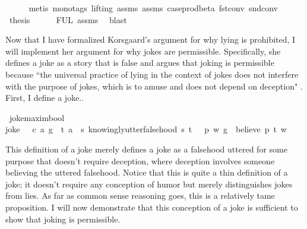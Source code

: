 \begin{isabellebody}
\ \ \ \ \isamarkupfalse%
\ {\isacharparenleft}metis\ {\isacharparenleft}mono{\isacharunderscore}tags{\isacharcomma}\ lifting{\isacharparenright}\ assms{\isacharparenleft}{}{\isacharparenright}\ assms{\isacharparenleft}{}{\isacharparenright}\ case{\isacharunderscore}prod{\isacharunderscore}beta\ fst{\isacharunderscore}conv\ snd{\isacharunderscore}conv{\isacharparenright}\isanewline
\ \ \isamarkupfalse%
\ {\isacharquery}thesis\isanewline
\ \ \ \ \isamarkupfalse%
\ FUL\ assms{\isacharparenleft}{}{\isacharparenright}\ \isamarkupfalse%
\ blast\ \isanewline
%
\isanewline
{}\isamarkupfalse%
%
\endisatagproof
{\isafoldproof}%
%
\isadelimproof
%
\endisadelimproof
%
\begin{isamarkuptext}%
Now that I have formalized Korsgaard's argument for why lying is prohibited, I will 
implement her argument for why jokes are permissible. Specifically, she defines a joke as a story that is 
false and argues that joking is permissible because ``the universal practice of lying in the context of jokes
does not interfere with the purpose of jokes, which is to amuse and does not depend on
deception" \citep[4]{KorsgaardRTL}. First, I define a joke..%
\end{isamarkuptext}\isamarkuptrue%
\isamarkupfalse%
\ joke{\isacharcolon}{\isacharcolon}{\isachardoublequoteopen}maxim{\isasymRightarrow}bool{\isachardoublequoteclose}\ \ \isanewline
{\isachardoublequoteopen}joke\ {\isasymequiv}\ {\isasymlambda}\ {\isacharparenleft}c{\isacharcomma}\ a{\isacharcomma}\ g{\isacharparenright}{\isachardot}\ \ {\isasymexists}t{\isachardot}\ {\isacharparenleft}a\ \isactrlbold {\isasymlongrightarrow}\ {\isacharparenleft}{\isasymlambda}s{\isachardot}\ knowingly{\isacharunderscore}utter{\isacharunderscore}falsehood\ s\ t{\isacharparenright}{\isacharparenright}\ {\isasymand}\ {\isasymnot}\ {\isacharparenleft}{\isasymexists}p{\isachardot}\ {\isasymforall}w{\isachardot}\ {\isacharparenleft}g\ \isactrlbold {\isasymrightarrow}\ {\isacharparenleft}believe\ p\ t{\isacharparenright}{\isacharparenright}\ w{\isacharparenright}{\isachardoublequoteclose}%
\begin{isamarkuptext}%
This definition of a joke merely defines a joke as a falsehood uttered for some purpose that 
doesn't require deception, where deception involves someone believing the uttered falsehood. Notice 
that this is quite a thin definition of a joke; it doesn't require any conception of humor but merely
distinguishes jokes from lies. As far as common sense reasoning goes, this is a relatively tame proposition. 
I will now demonstrate that this conception of a joke is sufficient to show that joking is permissible.


\end{isamarkuptext}
\end{isabellebody}
